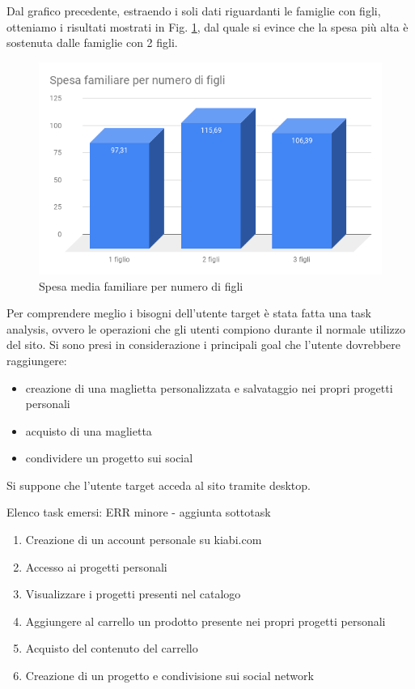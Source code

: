 \documentclass[12pt,italian,]{report}
\begin{document}
Dal grafico precedente, estraendo i soli dati riguardanti le famiglie con figli, otteniamo i risultati mostrati in Fig. \ref{spesa_media_n_figli}, dal quale si evince che la spesa più alta è sostenuta dalle famiglie con 2 figli.

\begin{figure}[h]
\centering
\includegraphics{img/Spesa_familiare_per_numero_di_figli.png}
\caption{Spesa media familiare per numero di figli}
\label{spesa_media_n_figli}
\end{figure}

Per comprendere meglio i bisogni dell'utente target è stata fatta una task analysis, ovvero le operazioni che gli utenti compiono durante il normale utilizzo del sito. Si sono presi in considerazione i principali goal che l'utente dovrebbere raggiungere:
\begin{itemize}
\item creazione di una maglietta personalizzata e salvataggio nei propri progetti personali
\item acquisto di una maglietta
\item condividere un progetto sui social
\end{itemize}

Si suppone che l'utente target acceda al sito tramite desktop.

Elenco task emersi: ERR minore - aggiunta sottotask
\begin{enumerate}
\item Creazione di un account personale su kiabi.com
\item Accesso ai progetti personali
\item Visualizzare i progetti presenti nel catalogo
\item Aggiungere al carrello un prodotto presente nei propri progetti personali
\item Acquisto del contenuto del carrello
\item Creazione di un progetto e condivisione sui social network 
\end{enumerate}
\end{document}
